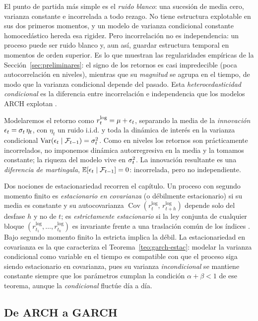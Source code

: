 El punto de partida más simple es el \emph{ruido blanco}: una sucesión de media cero, varianza constante e incorrelada a todo rezago. No tiene estructura explotable en sus dos primeros momentos, y un modelo de varianza condicional constante homocedástico hereda esa rigidez. Pero incorrelación no es independencia: un proceso puede ser ruido blanco y, aun así, guardar estructura temporal en momentos de orden superior. Es lo que muestran las regularidades empíricas de la Sección~\ref{sec:preliminares}: el signo de los retornos es casi impredecible (poca autocorrelación en niveles), mientras que su \emph{magnitud} se agrupa en el tiempo, de modo que la varianza condicional depende del pasado. Esta \emph{heterocedasticidad condicional} es la diferencia entre incorrelación e independencia que los modelos ARCH explotan \cite{cont2001}.

Modelaremos el retorno como $r_t^{\log} = \mu + \epsilon_t$, separando la media de la \emph{innovación} $\epsilon_t = \sigma_t\, \eta_t$, con $\eta_t$ un ruido i.i.d. y toda la dinámica de interés en la varianza condicional $\operatorname{Var}(\epsilon_t \mid \mathcal{F}_{t-1}) = \sigma_t^2$. Como en niveles los retornos son prácticamente incorrelados, no imponemos dinámica autorregresiva en la media y la tomamos constante; la riqueza del modelo vive en $\sigma_t^2$. La innovación resultante es una \emph{diferencia de martingala}, $\mathbb{E}[\epsilon_t \mid \mathcal{F}_{t-1}] = 0$: incorrelada, pero no independiente.

Dos nociones de estacionariedad recorren el capítulo. Un proceso con segundo momento finito es \emph{estacionario en covarianza} (o débilmente estacionario) si su media es constante y su autocovarianza $\operatorname{Cov}(r^{\log}_{t},\, r^{\log}_{t+h})$ depende solo del desfase $h$ y no de $t$; es \emph{estrictamente estacionario} si la ley conjunta de cualquier bloque $(r^{\log}_{t_1}, \dots, r^{\log}_{t_k})$ es invariante frente a una traslación común de los índices \cite{brockwell1991}. Bajo segundo momento finito la estricta implica la débil. La estacionariedad en covarianza es la que caracteriza el Teorema~\ref{teo:garch-estac}: modelar la varianza condicional como variable en el tiempo es compatible con que el proceso siga siendo estacionario en covarianza, pues su varianza \emph{incondicional} se mantiene constante siempre que los parámetros cumplan la condición $\alpha+\beta<1$ de ese teorema, aunque la \emph{condicional} fluctúe día a día.

\subsection{De ARCH a GARCH}
\label{sec:garch-arch}

